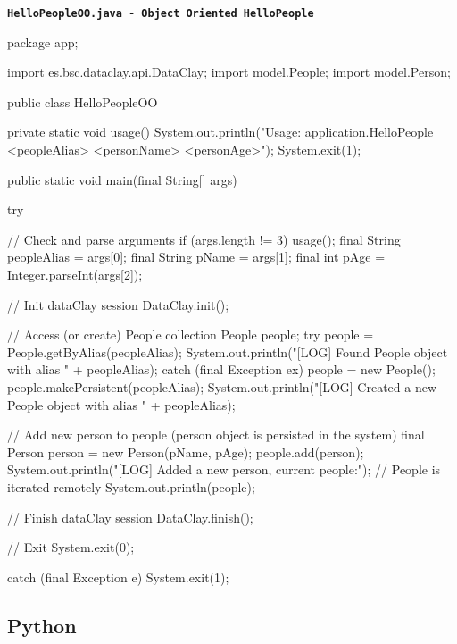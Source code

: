 \begin{tBox}
\texttt{\bfseries\textcolor{basecolor}{HelloPeopleOO.java - Object Oriented HelloPeople}}
\begin{java}
package app;

import es.bsc.dataclay.api.DataClay;
import model.People;
import model.Person;

public class HelloPeopleOO {
    private static void usage() {
        System.out.println("Usage: application.HelloPeople <peopleAlias> <personName> <personAge>");
        System.exit(1);
    }   

    public static void main(final String[] args) {
        try {
            // Check and parse arguments
            if (args.length != 3) {
                usage();
            }   
            final String peopleAlias = args[0];
            final String pName = args[1];
            final int pAge = Integer.parseInt(args[2]);

            // Init dataClay session
            DataClay.init();

            // Access (or create) People collection
            People people;
            try {
                people = People.getByAlias(peopleAlias);
                System.out.println("[LOG] Found People object with alias " + peopleAlias);
            } catch (final Exception ex) {
                people = new People();
                people.makePersistent(peopleAlias);
                System.out.println("[LOG] Created a new People object with alias " + peopleAlias);
            }   

            // Add new person to people (person object is persisted in the system)
            final Person person = new Person(pName, pAge);
            people.add(person);
            System.out.println("[LOG] Added a new person, current people:");
            // People is iterated remotely
            System.out.println(people);

            // Finish dataClay session
            DataClay.finish();

            // Exit
            System.exit(0);
        } catch (final Exception e) {
            System.exit(1);
        }   
    }   
}
\end{java}
\end{tBox}


\subsection{Python}
\label{sec:PythonFirstApp}

